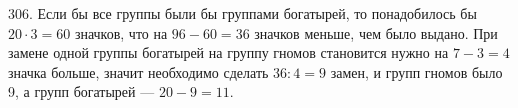 306. Если бы все группы были бы группами богатырей, то понадобилось бы $20\cdot3=60$ значков, что на $96-60=36$ значков меньше, чем было выдано. При замене одной группы богатырей на группу гномов становится нужно на $7-3=4$ значка больше, значит необходимо сделать $36:4=9$ замен, и групп гномов было 9, а групп богатырей --- $20-9=11.$\\
